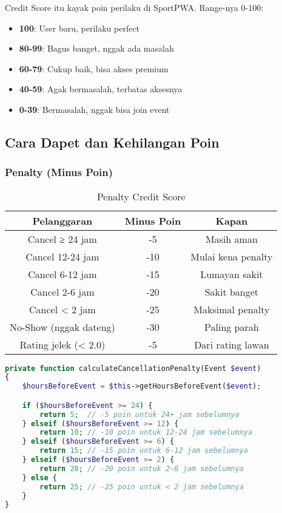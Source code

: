 \documentclass[12pt]{article}
\begin{document}
Credit Score itu kayak poin perilaku di SportPWA. Range-nya 0-100:
\begin{itemize}
    \item \textbf{100}: User baru, perilaku perfect
    \item \textbf{80-99}: Bagus banget, nggak ada masalah
    \item \textbf{60-79}: Cukup baik, bisa akses premium
    \item \textbf{40-59}: Agak bermasalah, terbatas aksesnya
    \item \textbf{0-39}: Bermasalah, nggak bisa join event
\end{itemize}

\subsection{Cara Dapet dan Kehilangan Poin}

\subsubsection{Penalty (Minus Poin)}

\begin{table}[H]
\centering
\begin{tabular}{|c|c|c|}
\hline
\textbf{Pelanggaran} & \textbf{Minus Poin} & \textbf{Kapan} \\
\hline
Cancel ≥ 24 jam & -5 & Masih aman \\
Cancel 12-24 jam & -10 & Mulai kena penalty \\
Cancel 6-12 jam & -15 & Lumayan sakit \\
Cancel 2-6 jam & -20 & Sakit banget \\
Cancel < 2 jam & -25 & Maksimal penalty \\
No-Show (nggak dateng) & -30 & Paling parah \\
Rating jelek (< 2.0) & -5 & Dari rating lawan \\
\hline
\end{tabular}
\caption{Penalty Credit Score}
\end{table}

\begin{lstlisting}[language=PHP, caption=Penalty Cancellation di CreditScoreService.php]
private function calculateCancellationPenalty(Event $event)
{
    $hoursBeforeEvent = $this->getHoursBeforeEvent($event);

    if ($hoursBeforeEvent >= 24) {
        return 5;  // -5 poin untuk 24+ jam sebelumnya
    } elseif ($hoursBeforeEvent >= 12) {
        return 10; // -10 poin untuk 12-24 jam sebelumnya
    } elseif ($hoursBeforeEvent >= 6) {
        return 15; // -15 poin untuk 6-12 jam sebelumnya
    } elseif ($hoursBeforeEvent >= 2) {
        return 20; // -20 poin untuk 2-6 jam sebelumnya
    } else {
        return 25; // -25 poin untuk < 2 jam sebelumnya
    }
}
\end{lstlisting}
\end{document}
